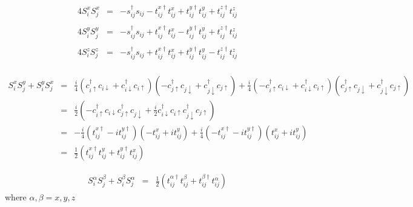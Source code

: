 \documentclass[12pt,a4paper]{article}
\newcommand{\hopping}[2] {
    c_{#1}^\dagger c_{#2}
}
\newcommand{\spinup} {
    \uparrow
}
\newcommand{\spindown} {
	\downarrow
}
\begin{document}
\begin{eqnarray*}
    4 S_{i}^{x} S_{j}^{x} & = & 
    - s_{ij}^{\dagger} s_{ij} - t_{ij}^{x\dagger} t_{ij}^{x} + t_{ij}^{y\dagger} t_{ij}^{y} + t_{ij}^{z\dagger} t_{ij}^{z} \\
    & {} & \\
    4 S_{i}^{y} S_{j}^{y} & = &
    - s_{ij}^{\dagger} s_{ij} + t_{ij}^{x\dagger} t_{ij}^{x} - t_{ij}^{y\dagger} t_{ij}^{y} + t_{ij}^{z\dagger} t_{ij}^{z} \\
    & {} & \\
    4 S_{i}^{z} S_{j}^{z} & = &
    - s_{ij}^{\dagger} s_{ij} + t_{ij}^{x\dagger} t_{ij}^{x} + t_{ij}^{y\dagger} t_{ij}^{y} - t_{ij}^{z\dagger} t_{ij}^{z} \\
\end{eqnarray*}

\begin{eqnarray*}
    S_{i}^{x} S_{j}^{y} + S_{i}^{y} S_{j}^{x}
    & = &
    \frac{i}{4} \left(\hopping{i\spinup}{i\spindown} + \hopping{i\spindown}{i\spinup} \right)
    \left(-\hopping{j\spinup}{j\spindown} + \hopping{j\spindown}{j\spinup} \right) + 
    \frac{i}{4} \left(-\hopping{i\spinup}{i\spindown} + \hopping{i\spindown}{i\spinup} \right)
    \left(\hopping{j\spinup}{j\spindown} + \hopping{j\spindown}{j\spinup} \right) \\
    & = &
    \frac{i}{2} \left(
        -\hopping{i\spinup}{i\spindown} \hopping{j\spinup}{j\spindown} +
        \frac{i}{2} \hopping{i\spindown}{i\spinup} \hopping{j\spindown}{j\spinup}
    \right) \\
    & = &
    -\frac{i}{4} \left(t_{ij}^{x\dagger} - i t_{ij}^{y\dagger} \right) \left(-t_{ij}^{x} +i t_{ij}^{y} \right) +
    \frac{i}{4} \left(-t_{ij}^{x\dagger} - i t_{ij}^{y\dagger} \right) \left(t_{ij}^{x} + i t_{ij}^{y} \right) \\
    & = &
    \frac{1}{2} \left(t_{ij}^{x\dagger}t_{ij}^{y} + t_{ij}^{y\dagger}t_{ij}^{x} \right)
\end{eqnarray*}

\begin{eqnarray*}
    S_{i}^{\alpha} S_{j}^{\beta} + S_{i}^{\beta} S_{j}^{\alpha}
    & = &
    \frac{1}{2} \left(t_{ij}^{\alpha\dagger}t_{ij}^{\beta} + t_{ij}^{\beta\dagger}t_{ij}^{\alpha} \right)
\end{eqnarray*}
where $\alpha, \beta = x, y, z$
\end{document}
